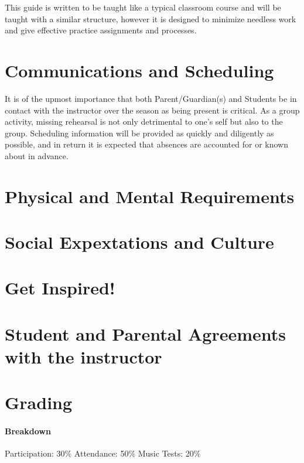 \documentclass[12pt,letterpaper]{book}
\begin{document}
This guide is written to be taught like a typical classroom course and will be taught with a similar structure, however it is designed to minimize needless work and give effective practice assignments and processes.

\section{Communications and Scheduling}

It is of the upmost importance that both Parent/Guardian(s) and Students be in contact with the instructor over the season as being present is critical.  As a group activity, missing rehearsal is not only detrimental to one's self but also to the group.  Scheduling information will be provided as quickly and diligently as possible, and in return it is expected that absences are accounted for or known about in advance.  

\section{Physical and Mental Requirements}

\section{Social Expextations and Culture}

\section{Get Inspired!}

\section{Student and Parental Agreements with the instructor}

\section{Grading}

\paragraph{Breakdown}

Participation: 30\%
Attendance: 50\%
Music Tests: 20\%
\end{document}
